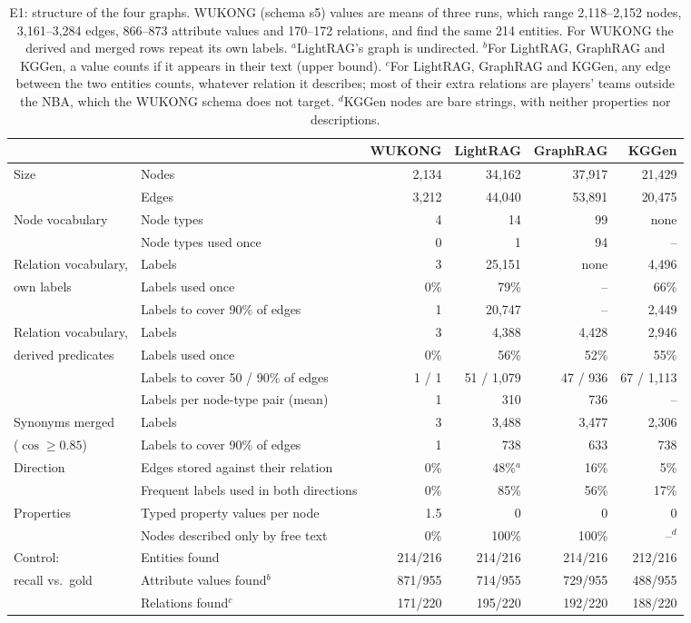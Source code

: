 \documentclass[11pt]{article}
\newcommand{\wk}{WUKONG}
\begin{document}
\begin{table}[h]
\centering
\footnotesize
\setlength{\tabcolsep}{4pt}
\begin{tabular}{llrrrr}
\toprule
 & & \wk & LightRAG & GraphRAG & KGGen \\
\midrule
Size & Nodes & 2,134 & 34,162 & 37,917 & 21,429 \\
 & Edges & 3,212 & 44,040 & 53,891 & 20,475 \\
\midrule
Node vocabulary & Node types & 4 & 14 & 99 & none \\
 & Node types used once & 0 & 1 & 94 & -- \\
\midrule
Relation vocabulary, & Labels & 3 & 25,151 & none & 4,496 \\
own labels & Labels used once & 0\% & 79\% & -- & 66\% \\
 & Labels to cover 90\% of edges & 1 & 20,747 & -- & 2,449 \\
\midrule
Relation vocabulary, & Labels & 3 & 4,388 & 4,428 & 2,946 \\
derived predicates & Labels used once & 0\% & 56\% & 52\% & 55\% \\
 & Labels to cover 50 / 90\% of edges & 1 / 1 & 51 / 1,079 & 47 / 936 & 67 / 1,113 \\
 & Labels per node-type pair (mean) & 1 & 310 & 736 & -- \\
\midrule
Synonyms merged & Labels & 3 & 3,488 & 3,477 & 2,306 \\
($\cos \ge 0.85$) & Labels to cover 90\% of edges & 1 & 738 & 633 & 738 \\
\midrule
Direction & Edges stored against their relation & 0\% & 48\%$^{a}$ & 16\% & 5\% \\
 & Frequent labels used in both directions & 0\% & 85\% & 56\% & 17\% \\
\midrule
Properties & Typed property values per node & 1.5 & 0 & 0 & 0 \\
 & Nodes described only by free text & 0\% & 100\% & 100\% & --$^{d}$ \\
\midrule
Control: & Entities found & 214/216 & 214/216 & 214/216 & 212/216 \\
recall vs.\ gold & Attribute values found$^{b}$ & 871/955 & 714/955 & 729/955 & 488/955 \\
 & Relations found$^{c}$ & 171/220 & 195/220 & 192/220 & 188/220 \\
\bottomrule
\end{tabular}
\caption{E1: structure of the four graphs. \wk{} (schema s5) values are means of three runs,
which range 2,118--2,152 nodes, 3,161--3,284 edges, 866--873 attribute values and 170--172
relations, and find the same 214 entities. For \wk{} the derived and merged rows repeat its own labels. $^{a}$LightRAG's graph is
undirected. $^{b}$For LightRAG, GraphRAG and KGGen, a value counts if it appears in their text
(upper bound). $^{c}$For LightRAG, GraphRAG and KGGen, any edge between the two entities counts,
whatever relation it describes; most of their extra relations are players' teams outside the NBA,
which the \wk{} schema does not target. $^{d}$KGGen nodes are bare strings, with neither
properties nor descriptions.}
\label{tab:e1}
\end{table}
\end{document}
